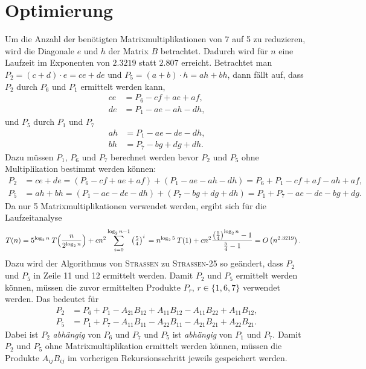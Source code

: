 \documentclass{scrartcl}
\begin{document}
\section{Optimierung}
Um die Anzahl der benötigten Matrixmultiplikationen von 7 auf 5 zu reduzieren, wird die Diagonale $e$ und $h$ der Matrix $B$ betrachtet. Dadurch wird für $n$ eine Laufzeit im Exponenten von $2.3219$ statt $2.807$ erreicht. Betrachtet man $P_2 = (c + d) \cdot e = ce + de$ und $P_5 = (a + b) \cdot h = ah + bh$, dann fällt auf, dass $P_2$ durch $P_6$ und $P_1$ ermittelt werden kann,
\begin{align*}
	ce &= P_6 - cf + ae + af, \\
	de &= P_1 - ae - ah - dh,
\end{align*}
und $P_5$ durch $P_1$ und $P_7$
\begin{align*}
	ah &= P_1 - ae - de - dh, \\
	bh &= P_7 - bg + dg + dh.
\end{align*}
Dazu müssen $P_1$, $P_6$ und $P_7$ berechnet werden bevor $P_2$ und $P_5$ ohne Multiplikation bestimmt werden können:
\begin{align*}
	P_2 &= ce + de = (P_6 - cf + ae + af) + (P_1 - ae - ah - dh) = P_6 + P_1 - cf + af - ah + af, \\
	P_5 &= ah + bh = (P_1 - ae - de - dh) + (P_7 - bg + dg + dh) = P_1 + P_7 - ae - de - bg + dg.
\end{align*}
Da nur 5 Matrixmultiplikationen verwendet werden, ergibt sich für die Laufzeitanalyse 
\begin{align*}
	\vphantom{\rule{0pt}{2.5ex}} T(n) &= 5^{\log_{2}n} \: T\Big(\frac{n}{2^{\log_{2}n}}\Big) + cn^2 \sum_{i = 0}^{\log_{2}n-1} \left(\tfrac{5}{4}\right)^i
	\vphantom{\rule{0pt}{2.5ex}} = n^{\log_{2}5} \: T(1) + cn^2 \frac{\left(\tfrac{5}{4}\right)^{\log_{2}n} - 1}{\tfrac{5}{4} - 1}
	\vphantom{\rule{0pt}{2.5ex}} = O\left(n^{2.3219}\right).
\end{align*}
Dazu wird der Algorithmus von \textsc{Strassen} zu \textsc{Strassen-25} so geändert, dass $P_2$ und $P_5$ in Zeile 11 und 12 ermittelt werden. Damit $P_2$ und $P_5$ ermittelt werden können, müssen die zuvor ermittelten Produkte $P_r$, $r \in \{1, 6, 7\}$ verwendet werden. Das bedeutet für 
\begin{align*}
	P_2 &= P_6 + P_1 - A_{21}B_{12} + A_{11}B_{12} - A_{11}B_{22} + A_{11}B_{12}, \\
	P_5 &= P_1 + P_7 - A_{11}B_{11} - A_{22}B_{11} - A_{21}B_{21} + A_{22}B_{21}.
\end{align*}
Dabei ist $P_2$ \textit{abhängig} von $P_6$ und $P_7$ und $P_5$ ist \textit{abhängig} von $P_1$ und $P_7$. Damit $P_2$ und $P_5$ ohne Matrixmultiplikation ermittelt werden können, müssen die Produkte $A_{ij}B_{ij}$ im vorherigen Rekursionsschritt jeweils gespeichert werden.
\end{document}
